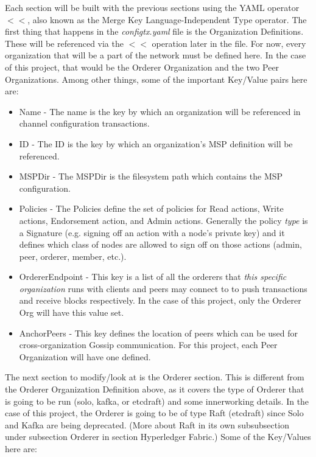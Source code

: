 \begin{itemize}
					\hspace{10mm}Each section will be built with the previous sections using the YAML operator $<<$, also known as the Merge Key Language-Independent Type operator. The first thing that happens in the \textit{configtx.yaml} file is the Organization Definitions. These will be referenced via the $<<$ operation later in the file. For now, every organization that will be a part of the network must be defined here. In the case of this project, that would be the Orderer Organization and the two Peer Organizations. Among other things, some of the important Key/Value pairs here are:
						\begin{itemize}
							\item Name - The name is the key by which an organization will be referenced in channel configuration transactions.
							\item ID - The ID is the key by which an organization's MSP definition will be referenced.
							\item MSPDir - The MSPDir is the filesystem path which contains the MSP configuration.
							\item Policies - The Policies define the set of policies for Read actions, Write actions, Endorsement action, and Admin actions. Generally the policy \textit{type} is a Signature (e.g. signing off an action with a node's private key) and it defines which class of nodes are allowed to sign off on those actions (admin, peer, orderer, member, etc.).
							\item OrdererEndpoint - This key is a list of all the orderers that \textit{this specific organization} runs with clients and peers may connect to to push transactions and receive blocks respectively. In the case of this project, only the Orderer Org will have this value set.
							\item AnchorPeers - This key defines the location of peers which can be used for cross-organization Gossip communication. For this project, each Peer Organization will have one defined.
						\end{itemize}
							
					\hspace{10mm}The next section to modify/look at is the Orderer section. This is different from the Orderer Organization Definition above, as it covers the type of Orderer that is going to be run (solo, kafka, or etcdraft) and some innerworking details. In the case of this project, the Orderer is going to be of type Raft (etcdraft) since Solo and Kafka are being deprecated. (More about Raft in its own subsubsection under subsection Orderer in section Hyperledger Fabric.) Some of the Key/Values here are:
					

\end{itemize}
